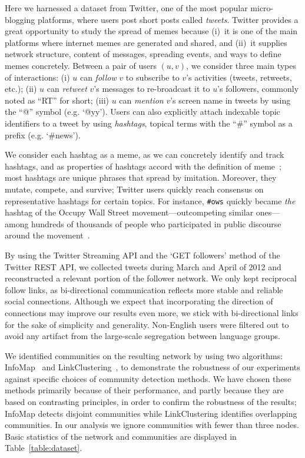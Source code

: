 \documentclass[letterpaper]{article}
\begin{document}
Here we harnessed a dataset from Twitter, one of the most popular micro-blogging
platforms, where users post short posts called \emph{tweets}. Twitter provides
a great opportunity to study the spread of memes because (i)~it is one of the main
platforms where internet memes are generated and shared, and (ii)~it
supplies network structure, content of messages, spreading events, and
ways to define memes concretely.
Between a pair of users $(u,v)$, we consider three main types of interactions:
(i) $u$ can \emph{follow} $v$ to subscribe to $v$'s activities (tweets, retweets, etc.); (ii) $u$ can
\emph{retweet} $v$'s messages to re-broadcast it to $u$'s followers, commonly
noted as ``RT'' for short; (iii) $u$ can \emph{mention} $v$'s screen name in tweets by
using the ``@'' symbol (e.g. `@yy').  Users can also explicitly attach
indexable topic identifiers to a tweet by using \emph{hashtags}, topical terms
with the ``\#'' symbol as a prefix (e.g. `\#news').


We consider each hashtag as a meme, as we can concretely identify and track
hashtags, and as properties of hashtags accord with the definition of
meme~\cite{meme}; most hashtags are unique phrases that spread by imitation.
Moreover, they mutate, compete, and survive; Twitter users quickly reach
consensus on representative hashtags for certain topics.  For instance,
\texttt{\#ows} quickly became \emph{the} hashtag of the Occupy Wall Street
movement---outcompeting similar ones---among hundreds of thousands of people
who participated in public discourse around the movement~\cite{conover2013ows}.


By using the Twitter Streaming API and the `GET followers' method of the Twitter REST API, we collected tweets during March and April of 2012 and reconstructed a relevant portion of the follower network. We only kept reciprocal follow links, as bi-directional communication reflects more stable and reliable social connections. Although we expect that incorporating the direction of connections may improve our results even more, we stick with bi-directional links for the sake of simplicity and generality. Non-English users were filtered out to avoid any artifact from the large-scale segregation between language groups.


We identified communities on the resulting network by using two algorithms: InfoMap~\cite{Rosvall2008InfoMap} and LinkClustering~\cite{Ahn2010LinkCommunity}, to demonstrate the robustness of our experiments against specific choices of community detection methods.
We have chosen these methods primarily because of their performance, and partly because they are based on contrasting principles, in order to confirm the robustness of the results; InfoMap detects disjoint communities while LinkClustering identifies overlapping communities.
In our analysis we ignore communities with fewer than three nodes.
Basic statistics of the network and communities are displayed in Table~\ref{table:dataset}.
\end{document}
